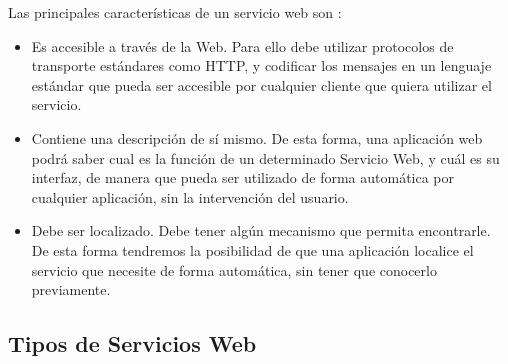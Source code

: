 Las principales características de un servicio web son \citep{TorresJoaquin2017SC}:



\begin{itemize}
	\item Es accesible a través de la Web. Para ello debe utilizar protocolos de transporte estándares como HTTP, y codificar los mensajes en un lenguaje estándar que pueda ser accesible por cualquier cliente que quiera utilizar el servicio. 
	\item Contiene una descripción de sí mismo. De esta forma, una aplicación web podrá saber cual es la función de un determinado Servicio Web, y cuál es su interfaz, de manera que pueda ser utilizado de forma automática por cualquier aplicación, sin la intervención del usuario.
	\item Debe ser localizado. Debe tener algún mecanismo que permita encontrarle. De esta forma tendremos la posibilidad de que una aplicación localice el servicio que necesite de forma automática, sin tener que conocerlo previamente.
\end{itemize}

\subsection{Tipos de Servicios Web}
\label{cap:subsec:tiposserviciosweb}

